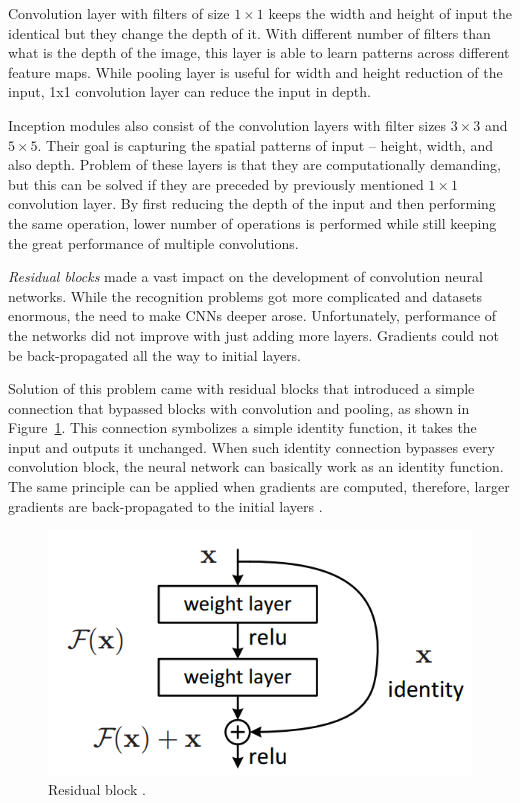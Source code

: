 Convolution layer with filters of size $1 \times 1$ keeps the width and height of input the identical but they change the depth of it. With different number of filters than what is the depth of the image, this layer is able to learn patterns across different feature maps. While pooling layer is useful for width and height reduction of the input, 1x1 convolution layer can reduce the input in depth.

Inception modules also consist of the convolution layers with filter sizes $3 \times 3$ and $5 \times 5$. Their goal is capturing the spatial patterns of input -- height, width, and also depth. Problem of these layers is that they are computationally demanding, but this can be solved if they are preceded by previously mentioned $1 \times 1$ convolution layer. By first reducing the depth of the input and then performing the same operation, lower number of operations is performed while still keeping the great performance of multiple convolutions.

\textit{Residual blocks} made a vast impact on the development of convolution neural networks. While the recognition problems got more complicated and datasets enormous, the need to make CNNs deeper arose. Unfortunately, performance of the networks did not improve with just adding more layers. Gradients could not be back-propagated all the way to initial layers.

Solution of this problem came with residual blocks that introduced a simple connection that bypassed blocks with convolution and pooling, as shown in Figure~\ref{fig:residual}. This connection symbolizes a simple identity function, it takes the input and outputs it unchanged. When such identity connection bypasses every convolution block, the neural network can basically work as an identity function. The same principle can be applied when gradients are computed, therefore, larger gradients are back-propagated to the initial layers \cite{he2015deep}.

\begin{figure}[ht]\centering
    \centering
    \includegraphics[scale=0.3]{figures/todo-residual.png}
    \caption{Residual block .}
    \label{fig:residual}
\end{figure}

